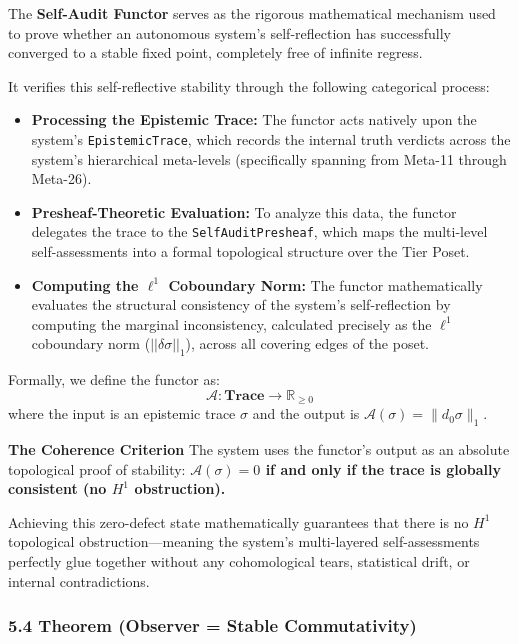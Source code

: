 \documentclass[
]{article}
\providecommand{\tightlist}{%
  \setlength{\itemsep}{0pt}\setlength{\parskip}{0pt}}
\begin{document}
The \textbf{Self-Audit Functor} serves as the rigorous mathematical
mechanism used to prove whether an autonomous system's self-reflection
has successfully converged to a stable fixed point, completely free of
infinite regress.

It verifies this self-reflective stability through the following
categorical process:

\begin{itemize}
\tightlist
\item
  \textbf{Processing the Epistemic Trace:} The functor acts natively
  upon the system's \texttt{EpistemicTrace}, which records the internal
  truth verdicts across the system's hierarchical meta-levels
  (specifically spanning from Meta-11 through Meta-26).
\item
  \textbf{Presheaf-Theoretic Evaluation:} To analyze this data, the
  functor delegates the trace to the \texttt{SelfAuditPresheaf}, which
  maps the multi-level self-assessments into a formal topological
  structure over the Tier Poset.
\item
  \textbf{Computing the \(\ell^1\) Coboundary Norm:} The functor
  mathematically evaluates the structural consistency of the system's
  self-reflection by computing the marginal inconsistency, calculated
  precisely as the \(\ell^1\) coboundary norm (\(||\delta\sigma||_1\)),
  across all covering edges of the poset.
\end{itemize}

Formally, we define the functor as:
\[\mathcal{A}: \mathbf{Trace} \to \mathbb{R}_{\ge 0}\] where the input
is an epistemic trace \(\sigma\) and the output is
\(\mathcal{A}(\sigma) = \|d_0 \sigma\|_1\).

\textbf{The Coherence Criterion} The system uses the functor's output as
an absolute topological proof of stability:
\textbf{\(\mathcal{A}(\sigma) = 0\) if and only if the trace is globally
consistent (no \(H^1\) obstruction).}

Achieving this zero-defect state mathematically guarantees that there is
no \(H^1\) topological obstruction---meaning the system's multi-layered
self-assessments perfectly glue together without any cohomological
tears, statistical drift, or internal contradictions.

\subsubsection{5.4 Theorem (Observer = Stable
Commutativity)}\label{theorem-observer-stable-commutativity}
\end{document}
